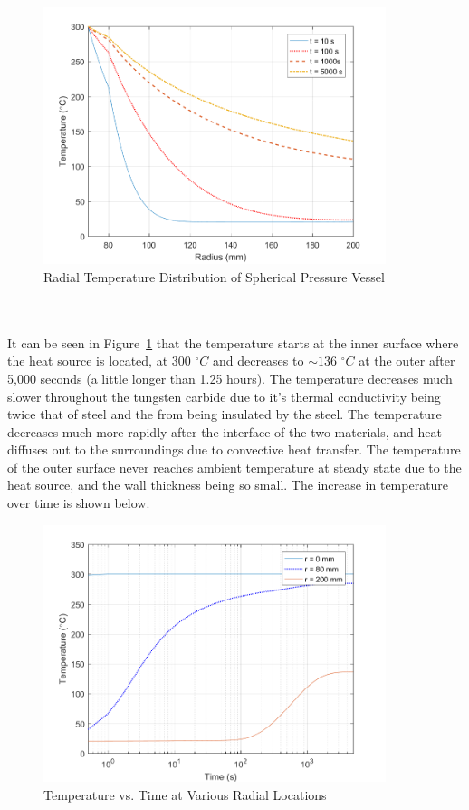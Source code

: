 \documentclass[times]{nmeauth}
\begin{document}
\begin{figure}[!htbp]
\centering \includegraphics[width=100mm]{TempDistribution} 
\caption{Radial Temperature Distribution of Spherical Pressure Vessel\label{fig:1}}
\end{figure}\\\\
It can be seen in Figure~\ref{fig:1} that the temperature starts at the inner surface where the heat source is located, at 300 $^{\circ}{C}$ and decreases to $\sim{136}$ $^{\circ}{C}$ at the outer after 5,000 seconds (a little longer than 1.25 hours). The temperature decreases much slower throughout the tungsten carbide due to it's thermal conductivity being twice that of steel and the from being insulated by the steel. The temperature decreases much more rapidly after the interface of the two materials, and heat diffuses out to the surroundings due to convective heat transfer. The temperature of the outer surface never reaches ambient temperature at steady state due to the heat source, and the wall thickness being so small. The increase in temperature over time is shown below.
\begin{figure}[!htbp]
\centering \includegraphics[width=100mm]{TempDistribution_Time}
\caption{Temperature vs. Time at Various Radial Locations \label{fig:2}}
\end{figure}
\end{document}
